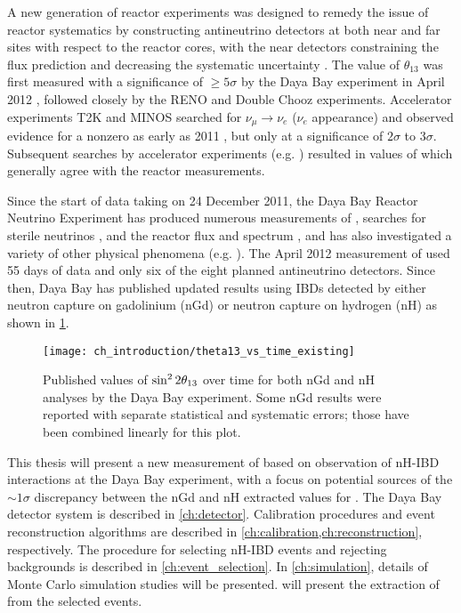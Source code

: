A new generation of reactor experiments
was designed to remedy the issue of reactor systematics
by constructing antineutrino detectors at both near and far sites
with respect to the reactor cores,
with the near detectors constraining the \nuebar{} flux prediction
and decreasing the systematic uncertainty \cite{near_far_proposal}.
The value of $\theta_{13}$ was first measured
with a significance of $\geq 5\sigma$
by the Daya Bay experiment in April 2012 \cite{ngd2012},
followed closely by the RENO \cite{reno2012}
and Double Chooz \cite{doublechooz2012} experiments.
Accelerator experiments T2K and MINOS
searched for $\nu_\mu\to\nu_e$ ($\nu_e$ appearance)
and observed evidence for a nonzero \thetaot{}
as early as 2011 \cite{t2k2011,minos2011},
but only at a significance of $2\sigma$ to $3\sigma$.
Subsequent searches by accelerator experiments (e.g. \cite{t2k2018})
resulted in values of \thetaot{} which generally agree
with the reactor measurements.

Since the start of data taking on 24 December 2011,
the Daya Bay Reactor Neutrino Experiment has produced numerous measurements of
\thetaot{}, searches for sterile neutrinos \cite{dyb_sterile2020},
and the reactor \nuebar{} flux and spectrum \cite{dyb_spec_decomp2019},
and has also investigated
a variety of other physical phenomena (e.g. \cite{dyb_cpt2018}).
The April 2012 measurement of \thetaot{} used 55 days of \nuebar{} data
and only six of the eight planned antineutrino detectors.
Since then, Daya Bay has published updated results using IBDs detected by
either neutron capture on gadolinium (nGd)
\cite{ngd2012,ngd2013,ngd2014,ngd2015,ngd2016,ngd2018}
or neutron capture on hydrogen (nH)
\cite{nh2014,nh2016}
as shown in \cref{fig:theta13_vs_t}.

\begin{figure}
    \centering
    \texttt{[image: ch\_introduction/theta13\_vs\_time\_existing]}
    \caption[Daya Bay \thetaot{} results over time]{
        Published values of $\sin^{2}2\theta_{13}$ over time
        for both nGd and nH analyses by the Daya Bay experiment.
        Some nGd results were reported with separate statistical
        and systematic errors;
        those have been combined linearly for this plot.
    }
    \label{fig:theta13_vs_t}
\end{figure}

This thesis will present a new measurement of \thetaot{}
based on observation of nH-IBD interactions
at the Daya Bay experiment,
with a focus on potential sources of the ${\sim}1\sigma$ discrepancy
between the nGd and nH extracted values for \thetaot{}.
The Daya Bay detector system is described in \cref{ch:detector}.
Calibration procedures and event reconstruction algorithms
are described in \cref{ch:calibration,ch:reconstruction}, respectively.
The procedure for selecting nH-IBD events and rejecting backgrounds
is described in \cref{ch:event_selection}.
In \cref{ch:simulation}, details of Monte Carlo simulation studies
will be presented.
 will present the extraction of \thetaot{}
from the selected events.

